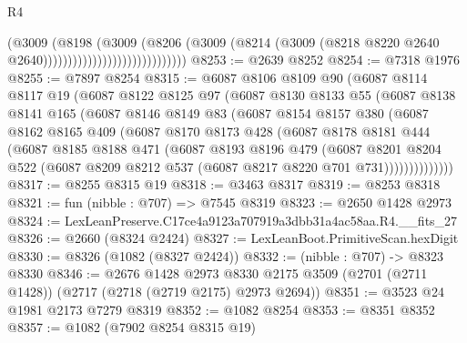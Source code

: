\begin{lexlean}{R4}
\begin{coremodule}
                                              (@3009
                                                (@8198
                                                  (@3009
                                                    (@8206
                                                      (@3009
                                                        (@8214
                                                          (@3009
                                                            (@8218
                                                              @8220
                                                              @2640
                                                              @2640)))))))))))))))))))))))))))))
@8253 := @2639 @8252
@8254 := @7318 @1976
@8255 := @7897 @8254
@8315 := @6087
    @8106
    @8109
    @90
    (@6087
      @8114
      @8117
      @19
      (@6087
        @8122
        @8125
        @97
        (@6087
          @8130
          @8133
          @55
          (@6087
            @8138
            @8141
            @165
            (@6087
              @8146
              @8149
              @83
              (@6087
                @8154
                @8157
                @380
                (@6087
                  @8162
                  @8165
                  @409
                  (@6087
                    @8170
                    @8173
                    @428
                    (@6087
                      @8178
                      @8181
                      @444
                      (@6087
                        @8185
                        @8188
                        @471
                        (@6087
                          @8193
                          @8196
                          @479
                          (@6087
                            @8201
                            @8204
                            @522
                            (@6087 @8209 @8212 @537 (@6087 @8217 @8220 @701 @731))))))))))))))
@8317 := @8255 @8315 @19
@8318 := @3463 @8317
@8319 := @8253 @8318
@8321 := fun (nibble : @707) => @7545 @8319
@8323 := @2650 @1428 @2973
@8324 := LexLeanPreserve.C17ce4a9123a707919a3dbb31a4ac58aa.R4.__fits_27
@8326 := @2660 (@8324 @2424)
@8327 := LexLeanBoot.PrimitiveScan.hexDigit
@8330 := @8326 (@1082 (@8327 @2424))
@8332 := (nibble : @707) -> @8323 @8330
@8346 := @2676
    @1428
    @2973
    @8330
    @2175
    @3509
    (@2701 (@2711 @1428))
    (@2717 (@2718 (@2719 @2175) @2973 @2694))
@8351 := @3523 @24 @1981 @2173 @7279 @8319
@8352 := @1082 @8254
@8353 := @8351 @8352
@8357 := @1082 (@7902 @8254 @8315 @19)

\end{coremodule}
\end{lexlean}
